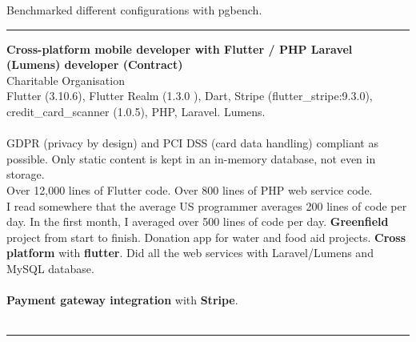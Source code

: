 \documentclass{article}
\begin{document}
Benchmarked different configurations with pgbench. \\



\noindent\hfil\rule{0.5\textwidth}{.4pt}\hfil





\textbf{ Cross-platform mobile developer with Flutter / PHP Laravel (Lumens) developer (Contract) } \\
Charitable Organisation %
\\
Flutter (3.10.6), Flutter Realm (1.3.0 ), Dart, Stripe (flutter\_stripe:9.3.0), credit\_card\_scanner (1.0.5), PHP, Laravel. Lumens.\\
\\
GDPR (privacy by design) and PCI DSS (card data handling) compliant as possible. Only static content is kept in an in-memory database, not even in storage. \\
Over 12,000 lines of Flutter code. Over 800 lines of PHP web service code. \\
I read somewhere that the average US programmer averages 200 lines of code per day. In the first month, I averaged over 500 lines of code per day.
\textbf{Greenfield} project from start to finish. Donation app for water and food aid projects. \textbf{Cross platform} with \textbf{flutter}. Did all the web services with Laravel/Lumens and MySQL database. \\
\\ 
\textbf{Payment gateway integration} with \textbf{Stripe}. \\
\\


\noindent\hfil\rule{0.5\textwidth}{.4pt}\hfil
\\
\end{document}
